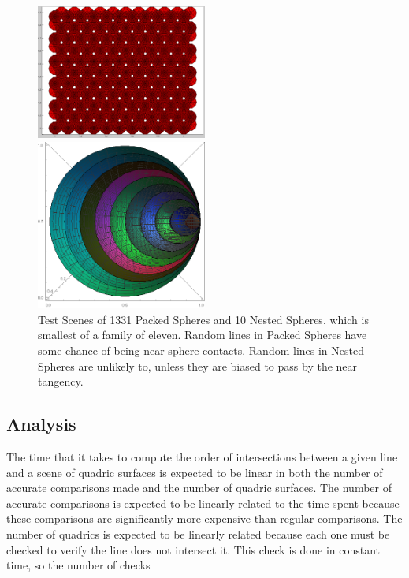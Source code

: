 \documentclass{cccg16}
\begin{document}
\begin{figure}
  \includegraphics[width=0.5\textwidth]{imgs/packedSpheres.png}
  \vspace{5mm}
  
  \includegraphics[width=0.5\textwidth]{imgs/hardEllipsoidsSingle.png}
  \caption{Test Scenes of 1331 Packed Spheres and 10 Nested Spheres,
    which is smallest of a family of eleven.  Random lines in Packed
    Spheres have some chance of being near sphere contacts.  Random
    lines in Nested Spheres are unlikely to, unless they are biased to
    pass by the near tangency.}
  \label{fig:testScenes}
\end{figure}

\subsection{Analysis}
The time that it takes to compute the order of intersections between a
given line and a scene of quadric surfaces is expected to be linear in
both the number of accurate comparisons made and the number of quadric
surfaces.  The number of accurate comparisons is expected to be
linearly related to the time spent because these comparisons are
significantly more expensive than regular comparisons.  The number of
quadrics is expected to be linearly related because each one must be
checked to verify the line does not intersect it.  This check is done
in constant time, so the number of checks
\end{document}
